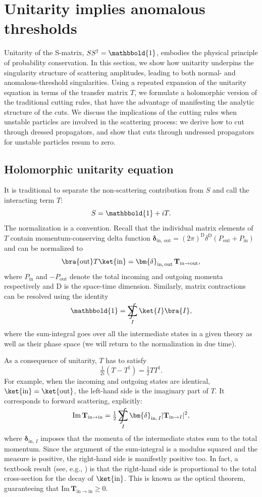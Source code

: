 \documentclass[12pt]{article}
\newcommand*{\boldone}{\mathbbold{1}}
\numberwithin{figure}{section}
\def \be {\begin{equation}}
\def \ee {\end{equation}}
\def \D {\mathrm{D}}
\def \geq {\geqslant}
\def \Im {\mathrm{Im}}
\def \inn {\mathrm{in}}
\def \out {\mathrm{out}}
\def \T {\mathbf{T}}
\newcommand{\bdelta}[2]{\bm{\delta}_{#1 , \, #2}}
\DeclareMathOperator*{\sumint}{%
\mathchoice%
  {\ooalign{$\displaystyle\sum$\cr\hidewidth$\displaystyle\int$\hidewidth\cr}}
  {\ooalign{\raisebox{.14\height}{\scalebox{.7}{$\textstyle\sum$}}\cr\hidewidth$\textstyle\int$\hidewidth\cr}}
  {\ooalign{\raisebox{.2\height}{\scalebox{.6}{$\scriptstyle\sum$}}\cr$\scriptstyle\int$\cr}}
  {\ooalign{\raisebox{.2\height}{\scalebox{.6}{$\scriptstyle\sum$}}\cr$\scriptstyle\int$\cr}}
}
\begin{document}
	\newpage
	\section{\label{sec:unitarity}Unitarity implies anomalous thresholds}
	
	Unitarity of the S-matrix, $S S^\dag = \boldone$, embodies the physical principle of probability conservation. In this section, we show how unitarity underpins the singularity structure of scattering amplitudes, leading to both normal- and anomalous-threshold singularities. Using a repeated expansion of the unitarity equation in terms of the transfer matrix $T$, we formulate a holomorphic version of the traditional cutting rules, that have the advantage of manifesting the analytic structure of the cuts. We discuss the implications of the cutting rules when unstable particles are involved in the scattering process: we derive how to cut through dressed propagators, and show that cuts through undressed propagators for unstable particles resum to zero.
	
	\subsection{Holomorphic unitarity equation}
	
	It is traditional to separate the non-scattering contribution from $S$ and call the interacting term $T$:
	\be
	S = \boldone + i T.
	\ee
	The normalization is a convention.
	Recall that the individual matrix elements of $T$ contain momentum-conserving delta function $\bdelta{\inn}{\out} = \left(2\pi\right)^\D \delta^\D\! \left(P_{\out}+P_{\inn}\right)$ and can be normalized to
	\be
	\bra{\out}T\ket{\inn} = \bdelta{\inn}{\out}\, \T_{\inn \to \out},
	\ee
	where $P_\inn$ and $-P_\out$ denote the total incoming and outgoing momenta respectively and $\D$ is the space-time dimension. Similarly, matrix contractions can be resolved using the identity
	\be
	\boldone = \sumint_I \ket{I} \bra{I},
	\ee
	where the sum-integral goes over all the intermediate states in a given theory as well as their phase space (we will return to the normalization in due time).
	
	As a consequence of unitarity, $T$ has to satisfy
	\be\label{eq:unitarityT}
	\tfrac{1}{2i}(T - T^\dagger) = \tfrac{1}{2} T T^\dagger.
	\ee
	For example, when the incoming and outgoing states are identical, $\ket{\inn} = \ket{\out}$, the left-hand side is the imaginary part of $T$. It corresponds to forward scattering, explicitly:
	\be
	\Im\, \T_{\inn\to\inn} = \tfrac{1}{2} \sumint_I \bdelta{\inn}{I} |\T_{\inn \to I}|^2 ,
	\label{eq:Impositive}
	\ee
	where $\bdelta{\inn}{I}$ imposes that the momenta of the intermediate states sum to the total momentum.
	Since the argument of the sum-integral is a modulus squared and the measure is positive, the right-hand side is manifestly positive too. In fact, a textbook result (see, e.g., \cite{Itzykson:1980rh}) is that the right-hand side is proportional to the total cross-section for the decay of $\ket{\inn}$. This is known as the optical theorem, guaranteeing that $\Im\, \T_{\inn\to\inn} \geq 0$.
	
\end{document}
